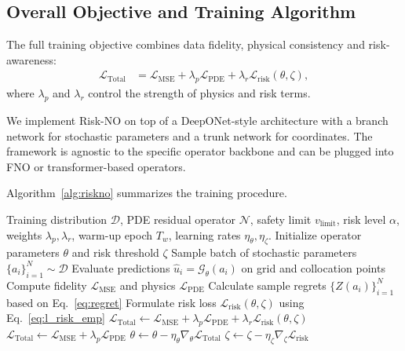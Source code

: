 \documentclass{article}
\newcommand{\Lrisk}{\mathcal{L}_{\text{risk}}}
\theoremstyle{plain}
\theoremstyle{definition}
\theoremstyle{remark}
\begin{document}
\subsection{Overall Objective and Training Algorithm}

The full training objective combines data fidelity, physical consistency and risk-awareness:
\begin{equation}
\begin{aligned}
    \mathcal{L}_{\text{Total}}
    &=
    \mathcal{L}_{\text{MSE}}
      + \lambda_p \mathcal{L}_{\text{PDE}}
      + \lambda_r \Lrisk(\theta,\zeta),
\end{aligned}
    \label{eq:total_loss}
\end{equation}
where $\lambda_p$ and $\lambda_r$ control the strength of physics and risk terms.

We implement Risk-NO on top of a DeepONet-style architecture with a branch network for stochastic parameters and a trunk network for coordinates. The framework is agnostic to the specific operator backbone and can be plugged into FNO or transformer-based operators.

Algorithm~\ref{alg:riskno} summarizes the training procedure.

\begin{algorithm}[t]
\caption{Training Risk-NO}
\label{alg:riskno}
\begin{algorithmic}[1]
\REQUIRE Training distribution $\mathcal{D}$, PDE residual operator $\mathcal{N}$, safety limit $v_{\text{limit}}$, risk level $\alpha$, weights $\lambda_p,\lambda_r$, warm-up epoch $T_w$, learning rates $\eta_\theta, \eta_\zeta$.
\STATE Initialize operator parameters $\theta$ and risk threshold $\zeta$
    \STATE Sample batch of stochastic parameters $\{a_i\}_{i=1}^N \sim \mathcal{D}$
    \STATE Evaluate predictions $\hat{u}_i = \mathcal{G}_\theta(a_i)$ on grid and collocation points
    \STATE Compute fidelity $\mathcal{L}_{\text{MSE}}$ and physics $\mathcal{L}_{\text{PDE}}$
    \STATE Calculate sample regrets $\{Z(a_i)\}_{i=1}^N$ based on Eq.~\eqref{eq:regret}
    \STATE Formulate risk loss $\Lrisk(\theta, \zeta)$ using Eq.~\eqref{eq:l_risk_emp}
        \STATE $\mathcal{L}_{\text{Total}} \gets \mathcal{L}_{\text{MSE}} + \lambda_p \mathcal{L}_{\text{PDE}} + \lambda_r \Lrisk(\theta, \zeta)$
    \ELSE
        \STATE $\mathcal{L}_{\text{Total}} \gets \mathcal{L}_{\text{MSE}} + \lambda_p \mathcal{L}_{\text{PDE}}$
    \ENDIF
    \STATE $\theta \gets \theta - \eta_\theta \nabla_\theta \mathcal{L}_{\text{Total}}$ 
    \STATE $\zeta \gets \zeta - \eta_\zeta \nabla_\zeta \Lrisk$ 
\ENDFOR
\end{algorithmic}
\end{algorithm}
\end{document}
